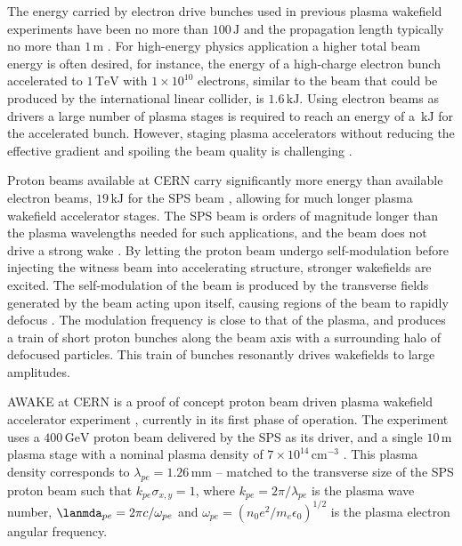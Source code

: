 \documentclass[aps,prstab,reprint,amsmath,amssymb,groupedaddress,onecolumn]{revtex4-1}
\newcommand{\unit}[1]{\,\mathrm{#1}}
\newcommand{\nexp}[1]{\times 10^{#1}}
\begin{document}
The energy carried by electron drive bunches used in previous plasma wakefield experiments have been no more than
$100\unit{J}$ and the propagation length typically no more than $1\unit{m}$ \cite{blumenfeld:2007,caldwell:2009}.  For high-energy physics application a higher total beam energy is often desired, for instance, the energy of a high-charge electron bunch accelerated to $1\unit{TeV}$ with $1\nexp{10}$ electrons, similar to the beam that could be produced by the
international linear collider, is $1.6\unit{kJ}$. Using electron beams 
as drivers a large number of plasma stages is required to reach %
an energy of a $\unit{kJ}$ for the accelerated bunch. However, staging plasma accelerators without reducing the
effective gradient and spoiling the beam quality is challenging \cite{steinke:2016,lindstrom:2016}.

Proton beams available at CERN carry significantly more energy than available electron beams, $19\unit{kJ}$ for the SPS beam \cite{gschwendtner:2016},
allowing for much longer plasma wakefield accelerator stages. The SPS beam is orders of magnitude longer
than the plasma wavelengths needed for such applications, and the beam %
does not drive a strong wake \cite{gschwendtner:2016}.  By letting the proton beam undergo
self-modulation before injecting the witness beam into accelerating structure, %
stronger wakefields are %
excited. The self-modulation of the beam is
produced by the transverse fields generated by the beam acting upon itself, causing regions of the beam to rapidly
defocus \cite{kumar:2010}. The modulation frequency is close to that of the plasma, and produces a train of short proton
bunches along the beam axis with a surrounding halo of defocused particles. This train of bunches resonantly %
drives
wakefields to large %
amplitudes.

AWAKE at CERN is a proof of concept proton beam driven plasma wakefield
accelerator experiment \cite{awake_collaboration:2014}, currently in its first phase of operation. The experiment uses a $400\unit{GeV}$ proton beam delivered by the
SPS as its driver, and a single $10\unit{m}$ plasma stage with a nominal plasma density of $7\nexp{14}\unit{cm}^{-3}$
\cite{gschwendtner:2016}. This plasma density corresponds to $\lambda_{pe} = 1.26\unit{mm}$ -- matched to the transverse
size of the SPS proton beam such that $k_{pe}\sigma_{x,y} = 1$, where $k_{pe} = 2\pi/\lambda_{pe}$ is the plasma wave
number, %
$\lanmda_{pe}=2\pi c/\omega_{pe}$ and $\omega_{pe}=\left(n_0e^2/m_e\epsilon_0\right)^{1/2}$ is the plasma electron angular frequency. %
\end{document}
